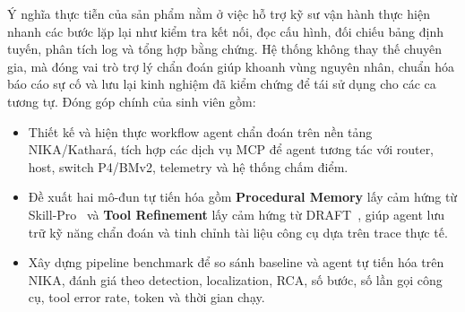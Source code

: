 Ý nghĩa thực tiễn của sản phẩm nằm ở việc hỗ trợ kỹ sư vận hành thực hiện nhanh các bước lặp lại như kiểm tra kết nối, đọc cấu hình, đối chiếu bảng định tuyến, phân tích log và tổng hợp bằng chứng. Hệ thống không thay thế chuyên gia, mà đóng vai trò trợ lý chẩn đoán giúp khoanh vùng nguyên nhân, chuẩn hóa báo cáo sự cố và lưu lại kinh nghiệm đã kiểm chứng để tái sử dụng cho các ca tương tự. Đóng góp chính của sinh viên gồm:
\begin{itemize}
  \item Thiết kế và hiện thực workflow agent chẩn đoán trên nền tảng NIKA/Kathará, tích hợp các dịch vụ MCP để agent tương tác với router, host, switch P4/BMv2, telemetry và hệ thống chấm điểm.
  \item Đề xuất hai mô-đun tự tiến hóa gồm \textbf{Procedural Memory} lấy cảm hứng từ Skill-Pro~\citep{skillpro2024} và \textbf{Tool Refinement} lấy cảm hứng từ DRAFT~\citep{draft2024}, giúp agent lưu trữ kỹ năng chẩn đoán và tinh chỉnh tài liệu công cụ dựa trên trace thực tế.
  \item Xây dựng pipeline benchmark để so sánh baseline và agent tự tiến hóa trên NIKA, đánh giá theo detection, localization, RCA, số bước, số lần gọi công cụ, tool error rate, token và thời gian chạy.
\end{itemize}
